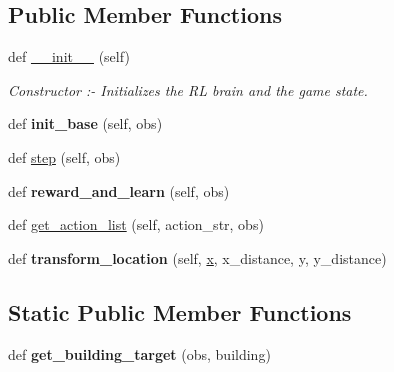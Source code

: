 \subsection*{Public Member Functions}
\begin{DoxyCompactItemize}
\item 
def \hyperlink{classBotty__McBotface_1_1Botty_a2b20c5c22329f5a75ef3c343e630a4c1}{\+\_\+\+\_\+init\+\_\+\+\_\+} (self)\hypertarget{classBotty__McBotface_1_1Botty_a2b20c5c22329f5a75ef3c343e630a4c1}{}\label{classBotty__McBotface_1_1Botty_a2b20c5c22329f5a75ef3c343e630a4c1}

\begin{DoxyCompactList}\small\item\em Constructor \+:-\/ Initializes the RL brain and the game state. \end{DoxyCompactList}\item 
def {\bfseries init\+\_\+base} (self, obs)\hypertarget{classBotty__McBotface_1_1Botty_a979fe38b2208653ab5195c7115e978c4}{}\label{classBotty__McBotface_1_1Botty_a979fe38b2208653ab5195c7115e978c4}

\item 
def \hyperlink{classBotty__McBotface_1_1Botty_a6ad2ce98b25c627204c31f37d26d40dc}{step} (self, obs)
\item 
def {\bfseries reward\+\_\+and\+\_\+learn} (self, obs)\hypertarget{classBotty__McBotface_1_1Botty_aaf8459960013f8b5e21e0928d7031026}{}\label{classBotty__McBotface_1_1Botty_aaf8459960013f8b5e21e0928d7031026}

\item 
def \hyperlink{classBotty__McBotface_1_1Botty_a230761c2312622094689a0950b1851a9}{get\+\_\+action\+\_\+list} (self, action\+\_\+str, obs)
\item 
def {\bfseries transform\+\_\+location} (self, \hyperlink{classBotty__McBotface_1_1Botty_ab149b8002cbcdcce9eee529f42c07d0f}{x}, x\+\_\+distance, y, y\+\_\+distance)\hypertarget{classBotty__McBotface_1_1Botty_a0d6257b0994cb62993fd6346f77d97dc}{}\label{classBotty__McBotface_1_1Botty_a0d6257b0994cb62993fd6346f77d97dc}

\end{DoxyCompactItemize}
\subsection*{Static Public Member Functions}
\begin{DoxyCompactItemize}
\item 
def {\bfseries get\+\_\+building\+\_\+target} (obs, building)\hypertarget{classBotty__McBotface_1_1Botty_a729cd86d54aa83a7f01a458d03fde940}{}\label{classBotty__McBotface_1_1Botty_a729cd86d54aa83a7f01a458d03fde940}

\end{DoxyCompactItemize}
